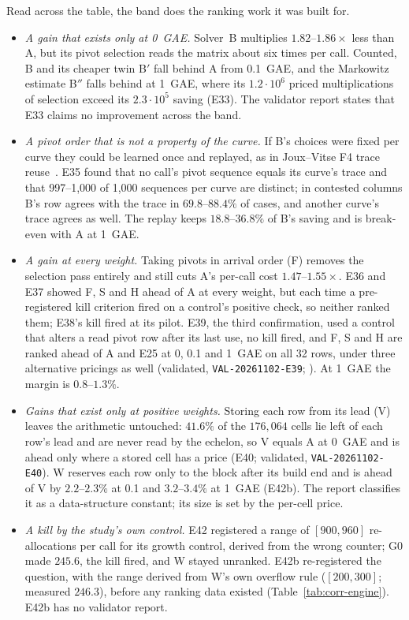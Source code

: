 Read across the table, the band does the ranking work it was built for.
\begin{itemize}
\item \emph{A gain that exists only at 0~GAE.} Solver~B multiplies
  $1.82$--$1.86\times$ less than A, but its pivot selection reads the matrix
  about six times per call. Counted, B and its cheaper twin B$'$ fall behind
  A from 0.1~GAE, and the Markowitz estimate B$''$ falls behind at 1~GAE,
  where its $1.2\cdot10^6$ priced multiplications of selection exceed its
  $2.3\cdot10^5$ saving (E33). The validator report states that E33 claims no
  improvement across the band.
\item \emph{A pivot order that is not a property of the curve.} If B's
  choices were fixed per curve they could be learned once and replayed,
  as in Joux--Vitse F4 trace reuse~\cite{jouxvitse2011f4}. E35 found that no
  call's pivot sequence equals its curve's trace and that 997--1{,}000 of
  1{,}000 sequences per curve are distinct; in contested columns B's row
  agrees with the trace in $69.8$--$88.4\%$ of cases, and another curve's
  trace agrees as well. The replay keeps $18.8$--$36.8\%$ of B's saving and
  is break-even with A at 1~GAE.
\item \emph{A gain at every weight.} Taking pivots in arrival order (F)
  removes the selection pass entirely and still cuts A's per-call cost
  $1.47$--$1.55\times$. E36 and E37 showed F, S and H ahead of A at every
  weight, but each time a pre-registered kill criterion fired on a
  control's positive check, so neither ranked them; E38's kill fired at its
  pilot. E39, the third confirmation, used a control that alters a read
  pivot row after its last use, no kill fired, and F, S and H are ranked
  ahead of A and E25 at 0, 0.1 and 1~GAE on all 32 rows, under three
  alternative pricings as well (validated, \texttt{VAL-20261102-E39};
  ). At 1~GAE the margin is
  $0.8$--$1.3\%$.
\item \emph{Gains that exist only at positive weights.} Storing each row
  from its lead (V) leaves the arithmetic untouched: $41.6\%$ of the
  $176{,}064$ cells lie left of each row's lead and are never read by the
  echelon, so V equals A at 0~GAE and is ahead only where a stored cell has
  a price (E40; validated, \texttt{VAL-20261102-E40}). W reserves each row
  only to the block after its build end and is ahead of V by $2.2$--$2.3\%$
  at 0.1 and $3.2$--$3.4\%$ at 1~GAE (E42b). The report classifies it as a
  data-structure constant; its size is set by the per-cell price.
\item \emph{A kill by the study's own control.} E42 registered a range of
  $[900,960]$ re-allocations per call for its growth control, derived from
  the wrong counter; G0 made $245.6$, the kill fired, and W stayed
  unranked. E42b re-registered the question, with the range derived from
  W's own overflow rule ($[200,300]$; measured $246.3$), before any ranking
  data existed (Table~\ref{tab:corr-engine}). E42b has no validator report.
\end{itemize}

